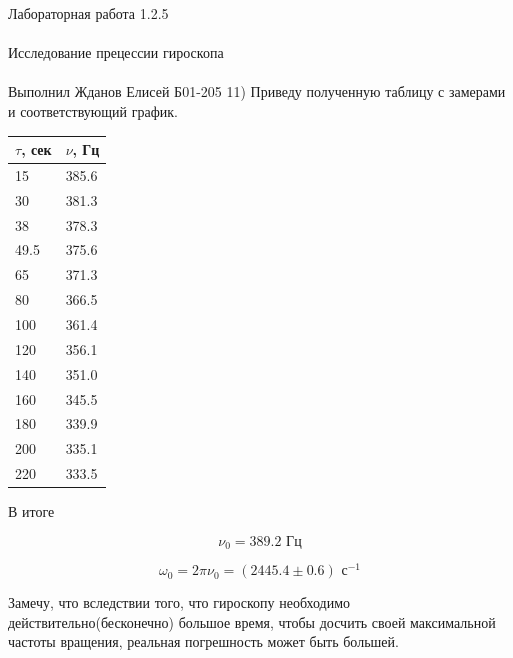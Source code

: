 \documentclass{astroedu-lab}
\begin{document}
\begin{problem}{\huge Лабораторная работа 1.2.5\\\\Исследование прецессии гироскопа\\\\Выполнил Жданов Елисей Б01-205}
11) Приведу полученную таблицу с замерами и соответствующий график.
\begin{center}
\begin{tabular}[t]{|l|l|}
\hline
$\tau$, сек & $\nu$, Гц \\
\hline
15  & 385.6 \\
30  & 381.3 \\
38  & 378.3 \\
49.5& 375.6 \\
65  & 371.3 \\
80  & 366.5 \\
100 & 361.4 \\
120 & 356.1 \\
140 & 351.0 \\
160 & 345.5 \\
180 & 339.9 \\
200 & 335.1 \\
220 & 333.5 \\

\hline
\end{tabular}
\end{center}

\begin{center}
\end{center}

В итоге

\begin{equation}
	\nu_0 = 389.2 \text{ Гц}
\end{equation}

\begin{equation}
	\boxed{\omega_0 = 2 \pi \nu_0 = (2445.4 \pm 0.6) \text{ с}^{-1}}
\end{equation}

Замечу, что вследствии того, что гироскопу необходимо действительно(бесконечно) большое время, чтобы досчить своей максимальной частоты вращения, реальная погрешность может быть большей.


\end{problem}
\end{document}
